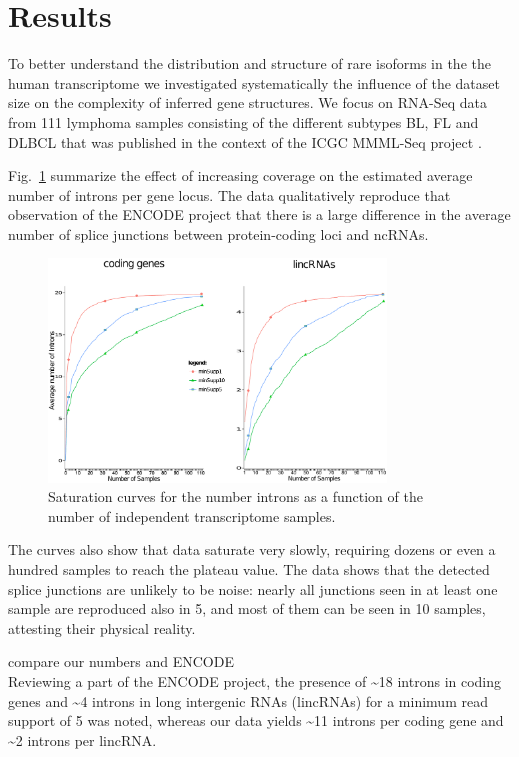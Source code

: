 \documentclass[ncrna,article,submit,moreauthors,pdftex,10pt,a4paper]{mdpi}
\newcommand{\TODO}[1]{\begingroup\color{red}#1\endgroup}
\begin{document}
\section{Results}

To better understand the distribution and structure of rare isoforms in the
the human transcriptome we investigated systematically the influence of the
dataset size on the complexity of inferred gene structures. We focus on
RNA-Seq data from 111 lymphoma samples consisting of the different subtypes
BL, FL and DLBCL that was published in the context of the ICGC MMML-Seq
project \cite{Richter:12a}.

Fig.~\ref{fig:saturation} summarize the effect of increasing coverage on
the estimated average number of introns per gene locus. The data
qualitatively reproduce that observation of the ENCODE project that there is
a large difference in the average number of splice junctions between
protein-coding loci and ncRNAs. 

\begin{figure}[t]
\begin{center}
  \includegraphics[width=0.8\textwidth]{saturation}
\end{center}
\caption{Saturation curves for the number introns as a function of the 
    number of independent transcriptome samples.}
  \label{fig:saturation} 
\end{figure}

The curves also show that data saturate very slowly, requiring dozens or
even a hundred samples to reach the plateau value. The data shows that the
detected splice junctions are unlikely to be noise: nearly all junctions
seen in at least one sample are reproduced also in 5, and most of them can
be seen in 10 samples, attesting their physical reality. 

\TODO{compare our numbers and ENCODE} \\
Reviewing a part of the ENCODE project, the presence of \textasciitilde{}18 introns in coding genes and \textasciitilde{}4 introns in long intergenic RNAs (lincRNAs) for a minimum read support of 5 was noted, whereas our data yields \textasciitilde{}11 introns per coding gene and \textasciitilde{}2 introns per lincRNA. \\
\end{document}
